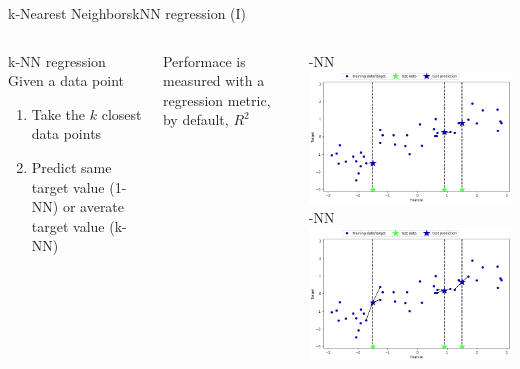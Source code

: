 \documentclass[10pt,compress]{beamer} %
\begin{document}
\begin{frame}{k-Nearest Neighbors}{kNN regression (I)}
    \begin{columns}
        \begin{block}{k-NN regression}
         Given a data point
        \begin{enumerate}
            \item Take the $k$ closest data points
            \item Predict same target value (1-NN) or averate target value (k-NN)
        \end{enumerate}
        \end{block}

        Performace is measured with a regression metric, by default, $R^2$

        -NN\\
	        \includegraphics[width=\textwidth]{figs/1-nn-reg.png}
         -NN\\
	        \includegraphics[width=\textwidth]{figs/3-nn-reg.png}
    \end{columns}
\end{frame}
\end{document}
